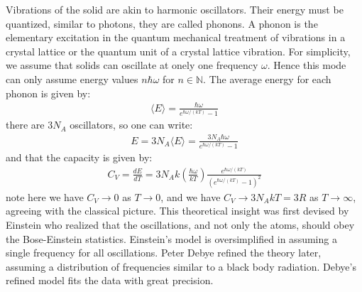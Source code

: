 \documentclass[11pt]{article}
\theoremstyle{break}
\theoremstyle{break}
\newcommand{\N}{\mathbb{N}}
\begin{document}
Vibrations of the solid are akin to harmonic oscillators. Their energy must be quantized, similar to photons, they are called phonons.
A phonon is the elementary excitation in the quantum mechanical treatment of vibrations in a crystal lattice or the quantum unit of a crystal lattice vibration. For simplicity, we assume that solids can oscillate at onely one frequency $\omega$. Hence this mode can only assume energy values $n\hbar \omega$ for $n \in \N$. The average energy for each phonon is given by:
\begin{align*}
\langle E\rangle= \frac{\hbar \omega}{e^{\hbar \omega/(kT)}-1}
\end{align*}
there are $3N_A$ oscillators, so one can write:
\begin{align*}
E = 3N_A\langle E\rangle=\frac{3N_A\hbar \omega}{e^{\hbar \omega/(kT)}-1}
\end{align*}
and that the capacity is given by:
\begin{align*}
C_V = \frac{dE}{dT} = 3N_Ak\left( \frac{\hbar\omega}{kT}\right)\frac{e^{\hbar \omega/(kT)}}{(e^{\hbar \omega / (kT)}-1)^2}
\end{align*}
note here we have $C_V \to 0$ as $T\to 0$, and we have $C_V \to 3N_A kT = 3R$ as $T \to \infty$, agreeing with the classical picture. This theoretical insight was first devised by Einstein who realized that the oscillations, and not only the atoms, should obey the Bose-Einstein statistics. Einstein's model is oversimplified in assuming a single frequency for all oscillations. Peter Debye refined the theory later, assuming a distribution of frequencies similar to a black body radiation. Debye's refined model fits the data with great precision.\\
\end{document}
